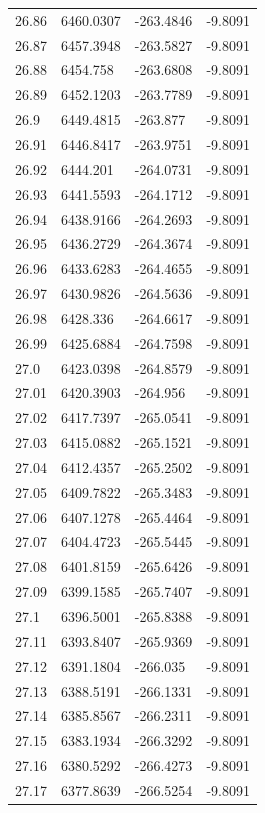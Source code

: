 \begin{table}[H]
\begin{tabular}{llll}
26.86 & 6460.0307 & -263.4846 & -9.8091 \\
26.87 & 6457.3948 & -263.5827 & -9.8091 \\
26.88 & 6454.758 & -263.6808 & -9.8091 \\
26.89 & 6452.1203 & -263.7789 & -9.8091 \\
26.9 & 6449.4815 & -263.877 & -9.8091 \\
26.91 & 6446.8417 & -263.9751 & -9.8091 \\
26.92 & 6444.201 & -264.0731 & -9.8091 \\
26.93 & 6441.5593 & -264.1712 & -9.8091 \\
26.94 & 6438.9166 & -264.2693 & -9.8091 \\
26.95 & 6436.2729 & -264.3674 & -9.8091 \\
26.96 & 6433.6283 & -264.4655 & -9.8091 \\
26.97 & 6430.9826 & -264.5636 & -9.8091 \\
26.98 & 6428.336 & -264.6617 & -9.8091 \\
26.99 & 6425.6884 & -264.7598 & -9.8091 \\
27.0 & 6423.0398 & -264.8579 & -9.8091 \\
27.01 & 6420.3903 & -264.956 & -9.8091 \\
27.02 & 6417.7397 & -265.0541 & -9.8091 \\
27.03 & 6415.0882 & -265.1521 & -9.8091 \\
27.04 & 6412.4357 & -265.2502 & -9.8091 \\
27.05 & 6409.7822 & -265.3483 & -9.8091 \\
27.06 & 6407.1278 & -265.4464 & -9.8091 \\
27.07 & 6404.4723 & -265.5445 & -9.8091 \\
27.08 & 6401.8159 & -265.6426 & -9.8091 \\
27.09 & 6399.1585 & -265.7407 & -9.8091 \\
27.1 & 6396.5001 & -265.8388 & -9.8091 \\
27.11 & 6393.8407 & -265.9369 & -9.8091 \\
27.12 & 6391.1804 & -266.035 & -9.8091 \\
27.13 & 6388.5191 & -266.1331 & -9.8091 \\
27.14 & 6385.8567 & -266.2311 & -9.8091 \\
27.15 & 6383.1934 & -266.3292 & -9.8091 \\
27.16 & 6380.5292 & -266.4273 & -9.8091 \\
27.17 & 6377.8639 & -266.5254 & -9.8091 \\

\end{tabular}
\end{table}
